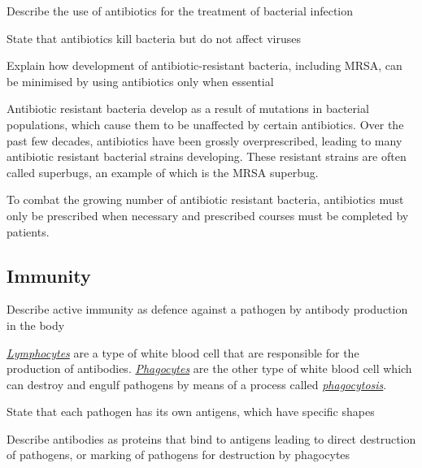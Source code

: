 \begin{point}
Describe the use of antibiotics for the treatment of bacterial infection
\end{point}

\begin{point}
State that antibiotics kill bacteria but do not affect viruses
\end{point}

\begin{point}
Explain how development of antibiotic-resistant bacteria, including MRSA, can be minimised by using 
antibiotics only when essential
\end{point}

Antibiotic resistant bacteria develop as a result of mutations in bacterial populations, which
cause them to be unaffected by certain antibiotics. Over the past few decades, antibiotics have
been grossly overprescribed, leading to many antibiotic resistant bacterial strains developing.
These resistant strains are often called superbugs, an example of which is the MRSA superbug.

To combat the growing number of antibiotic resistant bacteria, antibiotics must only be prescribed
when necessary and prescribed courses must be completed by patients.

\subsection{Immunity}

\begin{point}
Describe active immunity as defence against a pathogen by antibody production in the body
\end{point}

\underline{\emph{Lymphocytes}} are a type of white blood cell that are responsible for the 
production of antibodies. \underline{\emph{Phagocytes}} are the other type of white blood cell
which can destroy and engulf pathogens by means of a process called 
\underline{\emph{phagocytosis}}.

\begin{point}
State that each pathogen has its own antigens, which have specific shapes
\end{point}

\begin{point}
Describe antibodies as proteins that bind to antigens leading to direct destruction of pathogens, or 
marking of pathogens for destruction by phagocytes
\end{point}

